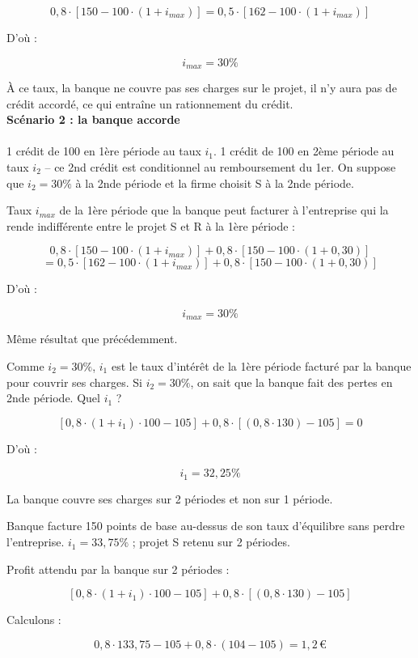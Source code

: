 \documentclass[a4paper, 12pt]{report}
\begin{document}
\[
0,8 \cdot [150 - 100 \cdot (1+i_{max})] = 0,5 \cdot [162 - 100 \cdot (1+i_{max})]
\]

D'où : 

\[
i_{max} = 30 \%
\]

À ce taux, la banque ne couvre pas ses charges sur le projet, il n’y aura pas de crédit accordé, ce qui entraîne un rationnement du crédit.\\

\textbf{Scénario 2 : la banque accorde}
\\\noindent\\
1 crédit de 100 en 1ère période au taux \( i_1 \). 1 crédit de 100 en 2ème période au taux \( i_2 \) – ce 2nd crédit est conditionnel au remboursement du 1er. On suppose que \( i_2 = 30 \% \) à la 2nde période et la firme choisit S à la 2nde période.

Taux \( i_{max} \) de la 1ère période que la banque peut facturer à l’entreprise qui la rende indifférente entre le projet S et R à la 1ère période :

\[
0,8 \cdot [150 - 100 \cdot (1+i_{max})] + 0,8 \cdot [150 - 100 \cdot (1+0,30)] 
\]
\[ 
= 0,5 \cdot [162 - 100 \cdot (1+i_{max})] + 0,8 \cdot [150 - 100 \cdot (1+0,30)]
 \]

D'où :

\[
i_{max} = 30 \%
\]

Même résultat que précédemment.

Comme \( i_2 = 30 \% \), \( i_1 \) est le taux d’intérêt de la 1ère période facturé par la banque pour couvrir ses charges. Si \( i_2 = 30 \% \), on sait que la banque fait des pertes en 2nde période. Quel \( i_1 \) ?

\[
[0,8 \cdot (1+i_1) \cdot 100 - 105] + 0,8 \cdot [(0,8 \cdot 130) - 105] = 0
\]

D'où :

\[
i_1 = 32,25 \%
\]

La banque couvre ses charges sur 2 périodes et non sur 1 période.

Banque facture 150 points de base au-dessus de son taux d’équilibre sans perdre l’entreprise. \( i_1 = 33,75 \% \) ; projet S retenu sur 2 périodes.

Profit attendu par la banque sur 2 périodes :

\[
[0,8 \cdot (1+i_1) \cdot 100 - 105] + 0,8 \cdot [(0,8 \cdot 130) - 105]
\]

Calculons :

\[
0,8 \cdot 133,75 - 105 + 0,8 \cdot (104 - 105) = 1,2 \,\text{€}
\]
\end{document}
